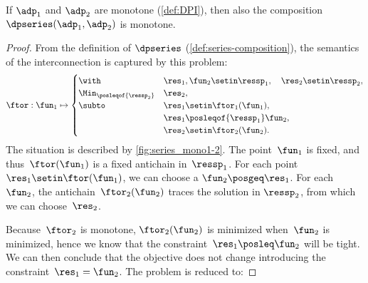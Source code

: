 \begin{proposition}
    \label{prop:series-monotone}
    If $\adp_{1}$ and $\adp_{2}$ are monotone (\cref{def:DPI}), then also the composition $\dpseries(\adp_{1},\adp_{2})$ is monotone.
\end{proposition}
\begin{proof}
    From the definition of $\dpseries$ (\cref{def:series-composition}), the semantics of the interconnection is captured by this problem:
    \begin{equation}
        \ftor:\fun_{1}\mapsto\begin{cases}
            \with                        & \res_{1},\fun_{2}\setin\ressp_{1},\quad\res_{2}\setin\ressp_{2}, \\
            \Min_{\posleqof{\ressp_{2}}} & \res_{2},                                                        \\
            \subto                       & \res_{1}\setin\ftor_{1}(\fun_{1}),                               \\
                                         & \res_{1}\posleqof{\ressp_{1}}\fun_{2},                           \\
                                         & \res_{2}\setin\ftor_{2}(\fun_{2}).
        \end{cases}\label{eq:dede}
    \end{equation}
    The situation is described by \cref{fig:series_mono1-2}.
    The point~$\fun_{1}$ is fixed, and thus~$\ftor(\fun_{1})$ is a fixed antichain in~$\ressp_{1}$.
    For each point $\res_{1}\setin\ftor(\fun_{1})$, we can choose a $\fun_{2}\posgeq\res_{1}$.
    For each~$\fun_{2}$, the antichain~$\ftor_{2}(\fun_{2})$ traces the solution in $\ressp_{2}$, from which we can choose~$\res_{2}$.


    Because~$\ftor_{2}$ is monotone, $\ftor_{2}(\fun_{2})$ is minimized when~$\fun_{2}$ is minimized, hence we know that the constraint~$\res_{1}\posleq\fun_{2}$ will be tight.
    We can then conclude that the objective does not change introducing the constraint~$\res_{1}=\fun_{2}$.
    The problem is reduced to:


\end{proof}
